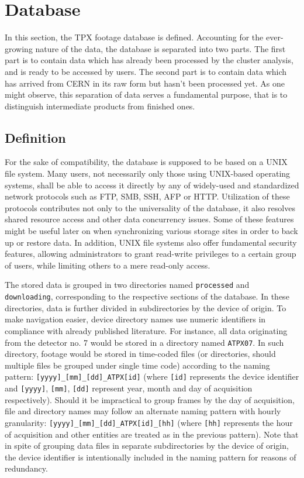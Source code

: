 \section{Database}
In this section, the TPX footage database is defined. Accounting for the ever-growing nature of the data, the database is separated into two parts. The first part is to contain data which has already been processed by the cluster analysis, and is ready to be accessed by users. The second part is to contain data which has arrived from CERN in its raw form but hasn't been processed yet. As one might observe, this separation of data serves a fundamental purpose, that is to distinguish intermediate products from finished ones.


\subsection{Definition}
For the sake of compatibility, the database is supposed to be based on a UNIX file system. Many users, not necessarily only those using UNIX-based operating systems, shall be able to access it directly by any of widely-used and standardized network protocols such as FTP, SMB, SSH, AFP or HTTP\label{db:supported-protocols}. Utilization of these protocols contributes not only to the universality of the database, it also resolves shared resource access and other data concurrency issues. Some of these features might be useful later on when synchronizing various storage sites in order to back up or restore data. In addition, UNIX file systems also offer fundamental security features, allowing administrators to grant read-write privileges to a certain group of users, while limiting others to a mere read-only access.

The stored data is grouped in two directories named \texttt{processed} and \texttt{downloading}, corresponding to the respective sections of the database. In these directories, data is further divided in subdirectories by the device of origin. To make navigation easier, device directory names use numeric identifiers in compliance with already published literature. For instance, all data originating from the detector no. 7 would be stored in a directory named \texttt{ATPX07}. In such directory, footage would be stored in time-coded files (or directories, should multiple files be grouped under single time code) according to the naming pattern: \texttt{[yyyy]\_[mm]\_[dd]\_ATPX[id]} (where \texttt{[id]} represents the device identifier and \texttt{[yyyy]}, \texttt{[mm]}, \texttt{[dd]} represent year, month and day of acquisition respectively). Should it be impractical to group frames by the day of acquisition, file and directory names may follow an alternate naming pattern with hourly granularity: \texttt{[yyyy]\_[mm]\_[dd]\_ATPX[id]\_[hh]} (where \texttt{[hh]} represents the hour of acquisition and other entities are treated as in the previous pattern). Note that in spite of grouping data files in separate subdirectories by the device of origin, the device identifier is intentionally included in the naming pattern for reasons of redundancy.

